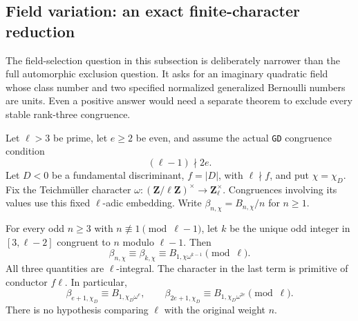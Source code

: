 \subsection{Field variation: an exact finite-character reduction}
\label{sec:kt-field-variation}

The field-selection question in this subsection is deliberately narrower
than the full automorphic exclusion question.  It asks for an imaginary
quadratic field whose class number and two specified normalized
generalized Bernoulli numbers are units.  Even a positive answer would
need a separate theorem to exclude every stable rank-three congruence.

Let $\ell>3$ be prime, let $e\geq2$ be even, and assume the actual
\texttt{GD} congruence condition
\[
                         (\ell-1)\nmid 2e.                 \tag{FV.1}
\]
Let $D<0$ be a fundamental discriminant, $f=|D|$, with $\ell\nmid f$,
and put $\chi=\chi_D$.  Fix the Teichm\"uller character
$\omega:(\mathbf Z/\ell\mathbf Z)^\times\to\mathbf Z_\ell^\times$.
Congruences involving its values use this fixed $\ell$-adic embedding.
Write $\beta_{n,\chi}=B_{n,\chi}/n$ for $n\geq1$.

\begin{proposition}
For every odd $n\geq3$ with $n\not\equiv1\pmod{\ell-1}$, let $k$ be
the unique odd integer in $[3,\ell-2]$ congruent to $n$ modulo
$\ell-1$.  Then
\[
 \beta_{n,\chi}\equiv\beta_{k,\chi}
       \equiv B_{1,\chi\omega^{k-1}}\pmod\ell.              \tag{FV.2}
\]
All three quantities are $\ell$-integral.  The character in the last
term is primitive of conductor $f\ell$.  In particular,
\[
 \beta_{e+1,\chi_D}\equiv B_{1,\chi_D\omega^e},\qquad
 \beta_{2e+1,\chi_D}\equiv B_{1,\chi_D\omega^{2e}}
                                      \pmod\ell.           \tag{FV.3}
\]
There is no hypothesis comparing $\ell$ with the original weight $n$.
\end{proposition}

